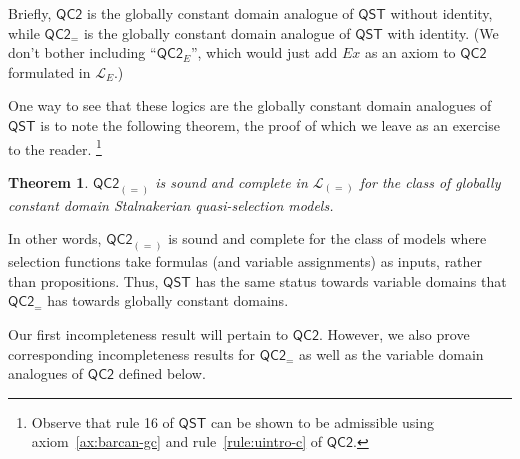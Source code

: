 \documentclass[12pt]{article}
\newtheorem{theorem}{Theorem}
\begin{document}
Briefly, $\mathsf{QC2}$ is the globally constant domain analogue of $\mathsf{QST}$ without identity, while $\mathsf{QC2_=}$ is the globally constant domain analogue of $\mathsf{QST}$ with identity.
(We don't bother including ``$\mathsf{QC2_{\textit{E}}}$'', which would just add $Ex$ as an axiom to $\mathsf{QC2}$ formulated in $\mathcal{L}_{E}$.) 

One way to see that these logics are the globally constant domain analogues of $\mathsf{QST}$ is to note the following theorem, the proof of which we leave as an exercise to the reader.%
\footnote{
    Observe that rule 16 of $\mathsf{QST}$ can be shown to be admissible using axiom~\ref{ax:barcan-gc} and rule~\ref{rule:uintro-c} of $\mathsf{QC2}$. 
    } %

\begin{theorem}
\label{thm:QC2-comp}
    $\mathsf{QC2}_{(=)}$ is sound and complete in $\mathcal{L}_{(=)}$ for the class of globally constant domain Stalnakerian quasi-selection models. 
\end{theorem}

\noindent In other words, $\mathsf{QC2}_{(=)}$ is sound and complete for the class of models where selection functions take formulas (and variable assignments) as inputs, rather than propositions. 
Thus, $\mathsf{QST}$ has the same status towards variable domains that $\mathsf{QC2}_=$ has towards globally constant domains. 

Our first incompleteness result will pertain to $\mathsf{QC2}$. 
However, we also prove corresponding incompleteness results for $\mathsf{QC2}_=$ as well as the variable domain analogues of $\mathsf{QC2}$ defined below.
\end{document}
